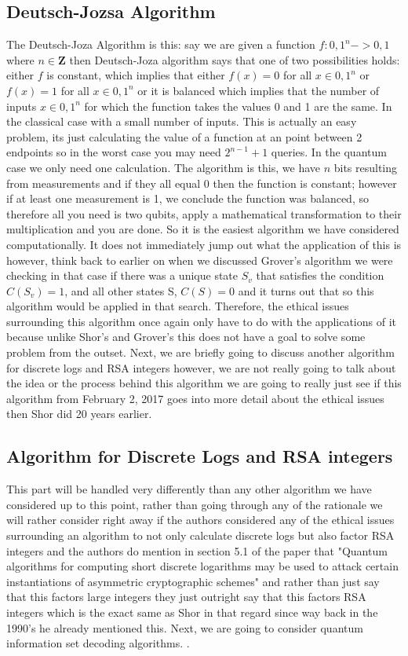 \documentclass{article}
\begin{document}
\subsection{Deutsch-Jozsa Algorithm}
The Deutsch-Joza Algorithm is this: say we are given a function $f: {0,1}^n -> {0,1}$ where $n \in \mathbf{Z}$ then Deutsch-Joza algorithm says that one of two possibilities holds: either $f$ is constant, which implies that either $f(x) = 0$ for all $x \in {0,1}^n$ or $f(x) = 1$ for all $x \in {0,1}^n$ or it is balanced which implies that the number of inputs $x \in {0,1}^n$ for which the function takes the values 0 and 1 are the same. In the classical case with a small number of inputs. This is actually an easy problem, its just calculating the value of a function at an point between 2 endpoints so in the worst case you may need $2^{n-1} +1$ queries. In the quantum case we only need one calculation. The algorithm is this, we have  $n$ bits resulting from measurements and if they all equal 0 then the function is constant; however if at least one measurement is 1, we conclude the function was balanced, so therefore all you need is two qubits, apply a mathematical transformation to their multiplication and you are done. So it is the easiest algorithm we have considered computationally. It does not immediately jump out what the application of this is however, think back to earlier on when we discussed Grover's algorithm we were checking in that case if there was a unique state $S_v$ that satisfies the condition$C(S_v) = 1 $, and all other states S, $C(S) = 0$ and it turns out that so this algorithm would be applied in that search\cite{Watrous2006}. Therefore, the ethical issues surrounding this algorithm once again only have to do with the applications of it because unlike Shor's and Grover's this does not have a goal to solve some problem from the outset. Next, we are briefly going to discuss another algorithm for discrete logs and RSA integers however, we are not really going to talk about the idea or the process behind this algorithm we are going to really just see if this algorithm from February 2, 2017 goes into more detail about the ethical issues then Shor did 20 years earlier. 
\subsection{Algorithm for Discrete Logs and RSA integers}
This part will be handled very differently than any other algorithm we have considered up to this point, rather than going through any of the rationale we will rather consider right away if the authors considered any of the ethical issues surrounding an algorithm to not only calculate discrete logs but also factor RSA integers and the authors do mention in section 5.1 of the paper that "Quantum algorithms for computing short discrete logarithms may be used to attack certain instantiations of asymmetric cryptographic schemes" \cite{Eker2017} and rather than just say that this factors large integers they just outright say that this factors RSA integers which is the exact same as Shor in that regard since way back in the 1990's he already mentioned this. Next, we are going to consider quantum information set decoding algorithms.
.
\end{document}
